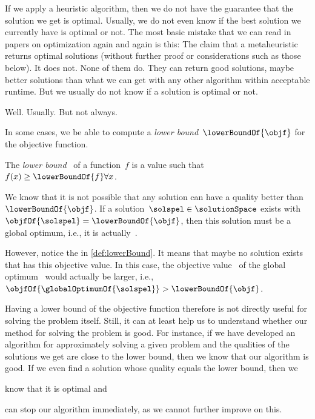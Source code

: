 %
\label{sec:objectiveFunctionBound}%
%
If we apply a heuristic algorithm, then we do not have the guarantee that the solution we get is optimal.
Usually, we do not even know if the best solution we currently have is optimal or not.
The most basic mistake that we can read in papers on optimization again and again is this:
The claim that a metaheuristic returns optimal solutions (without further proof or considerations such as those below).
It does not.
None of them do.
They can return good solutions, maybe better solutions than what we can get with any other algorithm within acceptable runtime.
But we usually do not know if a solution is optimal or not.

Well.
Usually.
But not always.

In some cases, we be able to compute a \emph{lower bound}~$\lowerBoundOf{\objf}$ for the objective function.%
%
%
%
\begin{definition}%
\label{def:lowerBound}%
The \emph{lower bound}~ of a function~$f$ is a value such that $f(x)\geq\lowerBoundOf{f}\forall x$.%
\end{definition}%
%
We know that it is not possible that any solution can have a quality better than~$\lowerBoundOf{\objf}$.
If a solution~$\solspel\in\solutionSpace$ exists with $\objfOf{\solspel}=\lowerBoundOf{\objf}$, then this solution must be a global optimum, i.e., it is actually~\globalOptimumOf{\solspel}.

However, notice the \inQuotes{$\geq$} in \cref{def:lowerBound}.
It means that maybe no solution exists that has this objective value.
In this case, the objective value~\objfOf{\globalOptimumOf{\solspel}} of the global optimum~\globalOptimumOf{\solspel} would actually be larger, i.e., $\objfOf{\globalOptimumOf{\solspel}}>\lowerBoundOf{\objf}$.

Having a lower bound of the objective function therefore is not directly useful for solving the problem itself.
Still, it can at least help us to understand whether our method for solving the problem is good.
For instance, if we have developed an algorithm for approximately solving a given problem and the qualities of the solutions we get are close to the lower bound, then we know that our algorithm is good.
If we even find a solution whose quality equals the lower bound, then we %
\begin{enumerate*}%
\item know that it is optimal and %
\item can stop our algorithm immediately, as we cannot further improve on this.%
\end{enumerate*}


